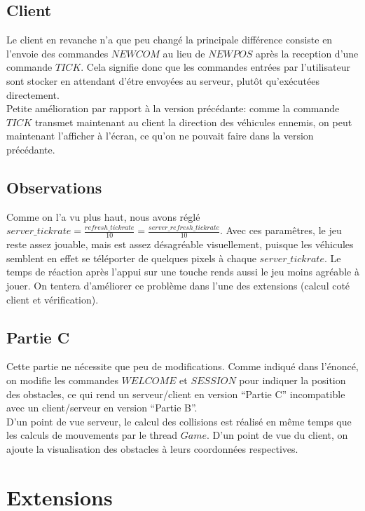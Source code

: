 \documentclass{article}
\begin{document}
\subsection{Client}
Le client en revanche n'a que peu changé la principale différence consiste en l'envoie des commandes $NEWCOM$ au lieu de $NEWPOS$ après la reception d'une commande $TICK$. Cela signifie donc que les commandes entrées par l'utilisateur sont stocker en attendant d'étre envoyées au serveur, plutôt qu'exécutées directement.\\
Petite amélioration par rapport à la version précédante: comme la commande $TICK$ transmet maintenant au client la direction des véhicules ennemis, on peut maintenant l'afficher à l'écran, ce qu'on ne pouvait faire dans la version précédante.

\subsection{Observations}
Comme on l'a vu plus haut, nous avons réglé $server\_tickrate = \frac{refresh\_tickrate}{10} = \frac{server\_refresh\_tickrate}{10}$. Avec ces paramêtres, le jeu reste assez jouable, mais est assez désagréable visuellement, puisque les véhicules semblent en effet se téléporter de quelques pixels à chaque $server\_tickrate$. Le temps de réaction après l'appui sur une touche rends aussi le jeu moins agréable à jouer. On tentera d'améliorer ce problème dans l'une des extensions (calcul coté client et vérification).

\subsection{Partie C}
Cette partie ne nécessite que peu de modifications. Comme indiqué dans l'énoncé, on modifie les commandes $WELCOME$ et $SESSION$ pour indiquer la position des obstacles, ce qui rend un serveur/client en version ``Partie C'' incompatible avec un client/serveur en version ``Partie B''.\\
D'un point de vue serveur, le calcul des collisions est réalisé en même temps que les calculs de mouvements par le thread $Game$. D'un point de vue du client, on ajoute la visualisation des obstacles à leurs coordonnées respectives.

\section{Extensions}
\end{document}
